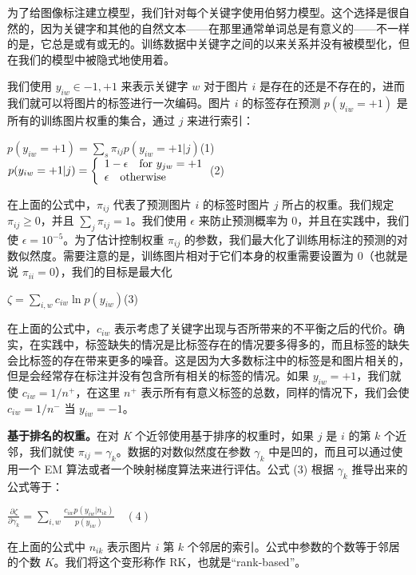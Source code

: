\documentclass[a4paper,twocolumn]{ctexart}
\begin{document}
为了给图像标注建立模型，我们针对每个关键字使用伯努力模型。这个选择是很自然的，因为关键字和其他的自然文本——在那里通常单词总是有意义的——不一样的是，它总是或有或无的。训练数据中关键字之间的以来关系并没有被模型化，但在我们的模型中被隐式地使用着。

我们使用 \(y_{iw} \in {-1,+1}\) 来表示关键字 \(w\) 对于图片 \(i\) 是存在的还是不存在的，进而我们就可以将图片的标签进行一次编码。图片 \(i\) 的标签存在预测 \(p(y_{iw} = +1)\) 是所有的训练图片权重的集合，通过 \(j\) 来进行索引：
\begin{center}
\({p(y_{iw} = +1) = \displaystyle \sum\limits_{s}\pi_{ij}p(y_{iw} = +1|j)}\)\quad\quad(1)
\({p(y_{iw} = +1|j) = \left\{
\begin{array}{l l}
1 - \epsilon \quad \textrm{for $y_{jw} = + 1$}\\
\epsilon \quad \textrm{otherwise}
\end{array}
\right.}\)\quad(2)
\end{center}
在上面的公式中，\(\pi_{ij}\) 代表了预测图片 \(i\) 的标签时图片 \(j\) 所占的权重。我们规定 \(\pi_{ij} \geq 0\)，并且 \(\displaystyle\sum\limits_{j}\pi_{ij} = 1\)。我们使用 \(\epsilon\) 来防止预测概率为 0，并且在实践中，我们使 \(\epsilon = 10^{-5}\)。为了估计控制权重 \(\pi_{ij}\) 的参数，我们最大化了训练用标注的预测的对数似然度。需要注意的是，训练图片相对于它们本身的权重需要设置为 0（也就是说 \(\pi_{ii} = 0\)），我们的目标是最大化
\begin{center}
\(\zeta = \displaystyle \sum\limits_{i,w}c_{iw}\ln p(y_{iw})\)\quad(3)
\end{center}
在上面的公式中，\(c_{iw}\) 表示考虑了关键字出现与否所带来的不平衡之后的代价。确实，在实践中，标签缺失的情况是比标签存在的情况要多得多的，而且标签的缺失会比标签的存在带来更多的噪音。这是因为大多数标注中的标签是和图片相关的，但是会经常存在标注并没有包含所有相关的标签的情况。如果 \(y_{iw} = +1\)，我们就使 \(c_{iw} = 1/n^+\)，在这里 \(n^+\) 表示所有有意义标签的总数，同样的情况下，我们会使 \(c_{iw} = 1/n^-\) 当 \(y_{iw} = -1\)。

\textbf{基于排名的权重。}\quad 在对 \textit{K} 个近邻使用基于排序的权重时，如果 \(j\) 是 \(i\) 的第 \(k\) 个近邻，我们就使 \(\pi_{ij} = \gamma_{k}\)。数据的对数似然度在参数 \(\gamma_{k}\) 中是凹的，而且可以通过使用一个 EM 算法或者一个映射梯度算法来进行评估。公式 (3) 根据 \(\gamma_{k}\) 推导出来的公式等于：
\begin{center}
\(\frac{\displaystyle \partial\zeta}{\displaystyle \partial\gamma_{k}} = \displaystyle \sum\limits_{i,w}\frac{c_{iw}p(y_{iw}|n_{ik})}{p(y_{iw})}\quad(4)\)
\end{center}
在上面的公式中 \(n_{ik}\) 表示图片 \(i\) 第 \(k\) 个邻居的索引。公式中参数的个数等于邻居的个数 \(K\)。我们将这个变形称作 RK，也就是“rank-based”。
\end{document}
